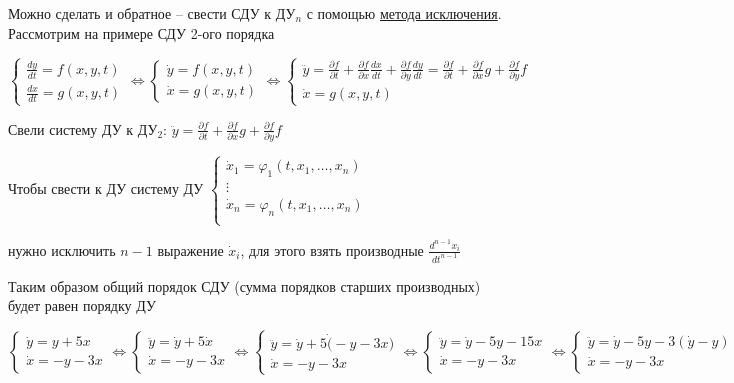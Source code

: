 \documentclass[12pt]{article}
\begin{document}
    Можно сделать и обратное -- свести СДУ к ДУ$_n$ с помощью 
    \underline{метода исключения}. Рассмотрим на примере СДУ 2-ого порядка

    $\begin{cases}
         \frac{dy}{dt} = f(x, y, t) \\
         \frac{dx}{dt} = g(x, y, t)
    \end{cases} \Longleftrightarrow \begin{cases}
         \dot{y} = f(x, y, t) \\
         \dot{x} = g(x, y, t)
    \end{cases} \Longleftrightarrow \begin{cases}
         \ddot y = \frac{\partial f}{\partial t} + \frac{\partial f}{\partial x}\frac{dx}{dt} + \frac{\partial f}{\partial y}\frac{dy}{dt} = \frac{\partial f}{\partial t} + \frac{\partial f}{\partial x}g + \frac{\partial f}{\partial y}f \\
         \dot{x} = g(x, y, t)
    \end{cases}$

    Свели систему ДУ к ДУ$_2$: $\ddot y = \frac{\partial f}{\partial t} + \frac{\partial f}{\partial x}g + \frac{\partial f}{\partial y}f$

    \Nota Чтобы свести к ДУ систему ДУ $\begin{cases}
         \dot x_1 = \varphi_1(t, x_1, \dots, x_n) \\
         \vdots \\
         \dot x_n = \varphi_n(t, x_1, \dots, x_n) \\
    \end{cases}$ 
    
    нужно исключить $n - 1$ выражение $\dot x_i$, для этого взять производные $\frac{d^{n - 1} x_i}{dt^{n - 1}}$

    Таким образом общий порядок СДУ (сумма порядков старших производных) будет равен порядку ДУ

    \Ex
    $\begin{cases}
        \dot y = y + 5x \\
        \dot x = -y - 3x
    \end{cases} \Longleftrightarrow
    \begin{cases}
        \ddot y = \dot y + 5\dot x \\
        \dot x = -y - 3x
    \end{cases} \Longleftrightarrow
    \begin{cases}
        \ddot y = \dot y + 5\dot (-y - 3x) \\
        \dot x = -y - 3x
    \end{cases} \Longleftrightarrow
    \begin{cases}
        \ddot y = \dot y - 5y - 15x \\
        \dot x = -y - 3x
    \end{cases} \Longleftrightarrow
    \begin{cases}
        \ddot y = \dot y - 5y - 3(\dot y - y) \\
        \dot x = -y - 3x
    \end{cases} \Longleftrightarrow \ddot y + 2\dot y + 2y = 0$
\end{document}
